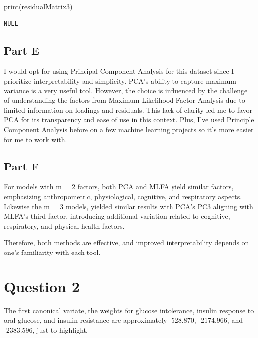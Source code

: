 \documentclass[
  letterpaper,
  DIV=11,
  numbers=noendperiod]{scrartcl}
\newenvironment{Shaded}{}{}
\newcommand{\FunctionTok}[1]{\textcolor[rgb]{0.41,0.62,0.42}{#1}}
\newcommand{\NormalTok}[1]{\textcolor[rgb]{0.24,0.22,0.21}{#1}}
\begin{document}
\begin{Shaded}
\begin{Highlighting}[]
\FunctionTok{print}\NormalTok{(residualMatrix3)}
\end{Highlighting}
\end{Shaded}

\begin{verbatim}
NULL
\end{verbatim}

\newpage{}

\hypertarget{part-e}{%
\subsection{Part E}\label{part-e}}

I would opt for using Principal Component Analysis for this dataset
since I prioritize interpretability and simplicity. PCA's ability to
capture maximum variance is a very useful tool. However, the choice is
influenced by the challenge of understanding the factors from Maximum
Likelihood Factor Analysis due to limited information on loadings and
residuals. This lack of clarity led me to favor PCA for its transparency
and ease of use in this context. Plus, I've used Principle Component
Analysis before on a few machine learning projects so it's more easier
for me to work with.

\newpage{}

\hypertarget{part-f}{%
\subsection{Part F}\label{part-f}}

For models with m = 2 factors, both PCA and MLFA yield similar factors,
emphasizing anthropometric, physiological, cognitive, and respiratory
aspects. Likewise the m = 3 models, yielded similar results with PCA's
PC3 aligning with MLFA's third factor, introducing additional variation
related to cognitive, respiratory, and physical health factors.

Therefore, both methods are effective, and improved interpretability
depends on one's familiarity with each tool.

\newpage{}

\hypertarget{question-2}{%
\section{Question 2}\label{question-2}}

The first canonical variate, the weights for glucose intolerance,
insulin response to oral glucose, and insulin resistance are
approximately -528.870, -2174.966, and -2383.596, just to highlight.
\end{document}
